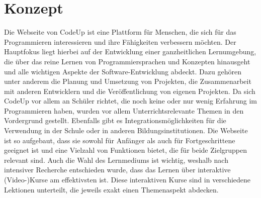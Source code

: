 \documentclass[main.tex]{subfiles}
\begin{document}
    \section{Konzept}
    Die Webseite von CodeUp ist eine Plattform für Menschen, die sich für das Programmieren interessieren und ihre Fähigkeiten verbessern möchten.
    Der Hauptfokus liegt hierbei auf der Entwicklung einer ganzheitlichen Lernumgebung, die über das reine Lernen von Programmiersprachen und Konzepten hinausgeht und alle wichtigen Aspekte der Software-Entwicklung abdeckt.
    Dazu gehören unter anderem die Planung und Umsetzung von Projekten, die Zusammenarbeit mit anderen Entwicklern und die Veröffentlichung von eigenen Projekten.
    Da sich CodeUp vor allem an Schüler richtet, die noch keine oder nur wenig Erfahrung im Programmieren haben, wurden vor allem Unterrichtsrelevante Themen in den Vordergrund gestellt.
    Ebenfalls gibt es Integrationsmöglichkeiten für die Verwendung in der Schule oder in anderen Bildungsinstitutionen.
    Die Webseite ist so aufgebaut, dass sie sowohl für Anfänger als auch für Fortgeschrittene geeignet ist und eine Vielzahl von Funktionen bietet, die für beide Zielgruppen relevant sind.
    Auch die Wahl des Lernmediums ist wichtig, weshalb nach intensiver Recherche entschieden wurde, dass das Lernen über interaktive (Video-)Kurse am effektivsten ist.
    Diese interaktiven Kurse sind in verschiedene Lektionen unterteilt, die jeweils exakt einen Themenaspekt abdecken.
\end{document}
